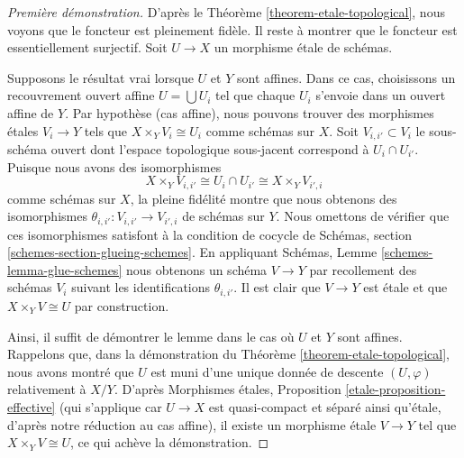 \begin{proof}[Premi\`ere d\'emonstration]
D'apr\`es le Th\'eor\`eme \ref{theorem-etale-topological},
nous voyons que le foncteur est pleinement fid\`ele.
Il reste \`a montrer que le foncteur est essentiellement surjectif.
Soit $U \to X$ un morphisme \'etale de sch\'emas.

\medskip\noindent
Supposons le r\'esultat vrai lorsque $U$ et $Y$ sont affines.
Dans ce cas, choisissons un recouvrement ouvert affine
$U = \bigcup U_i$ tel que chaque $U_i$ s'envoie
dans un ouvert affine de $Y$. Par hypoth\`ese (cas affine), nous pouvons
trouver des morphismes \'etales $V_i \to Y$ tels que $X \times_Y V_i \cong U_i$
comme sch\'emas sur $X$. Soit $V_{i, i'} \subset V_i$
le sous-sch\'ema ouvert dont l'espace topologique sous-jacent
correspond \`a $U_i \cap U_{i'}$. Puisque nous avons des isomorphismes
$$
X \times_Y V_{i, i'} \cong U_i \cap U_{i'} \cong X \times_Y V_{i', i}
$$
comme sch\'emas sur $X$, la pleine fid\'elit\'e montre que nous
obtenons des isomorphismes
$\theta_{i, i'} : V_{i, i'} \to V_{i', i}$ de sch\'emas sur $Y$.
Nous omettons de v\'erifier que ces isomorphismes satisfont \`a la
condition de cocycle de Schémas, section \ref{schemes-section-glueing-schemes}.
En appliquant Schémas, Lemme \ref{schemes-lemma-glue-schemes}
nous obtenons un sch\'ema $V \to Y$ par
recollement des sch\'emas $V_i$ suivant les identifications $\theta_{i, i'}$.
Il est clair que $V \to Y$ est \'etale et que $X \times_Y V \cong U$
par construction.

\medskip\noindent
Ainsi, il suffit de d\'emontrer le lemme dans le cas o\`u $U$ et $Y$ sont affines.
Rappelons que, dans la d\'emonstration du Th\'eor\`eme \ref{theorem-etale-topological},
nous avons montr\'e que $U$ est muni d'une unique donn\'ee de descente
$(U, \varphi)$ relativement \`a $X/Y$. D'apr\`es
Morphismes étales, Proposition \ref{etale-proposition-effective}
(qui s'applique car $U \to X$ est quasi-compact et s\'epar\'e
ainsi qu'\'etale, d'apr\`es notre r\'eduction au cas affine),
il existe un morphisme \'etale $V \to Y$ tel que
$X \times_Y V \cong U$, ce qui ach\`eve la d\'emonstration.
\end{proof}

